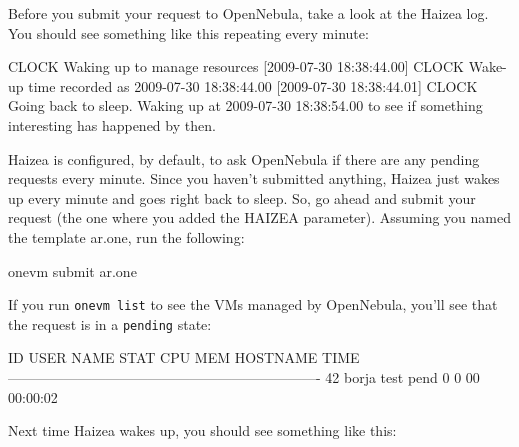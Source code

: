 Before you submit your request to OpenNebula, take a look at the Haizea log. You should see something like this repeating every minute:

\begin{wideshellverbatim}
[2009-07-30 18:38:44.00] CLOCK   Waking up to manage resources
[2009-07-30 18:38:44.00] CLOCK   Wake-up time recorded as 2009-07-30 18:38:44.00
[2009-07-30 18:38:44.01] CLOCK   Going back to sleep. 
                                 Waking up at 2009-07-30 18:38:54.00 
                                 to see if something interesting has happened by then.
\end{wideshellverbatim}

Haizea is configured, by default, to ask OpenNebula if there are any pending requests every minute. Since you haven't submitted anything, Haizea just wakes up every minute and goes right back to sleep. So, go ahead and submit your request (the one where you added the HAIZEA parameter). Assuming you named the template ar.one, run the following:

\begin{wideshellverbatim}
onevm submit ar.one
\end{wideshellverbatim}

If you run \texttt{onevm list} to see the VMs managed by OpenNebula, you'll see that the request is in a \texttt{pending} state:

\begin{wideshellverbatim}
  ID     USER     NAME STAT CPU     MEM        HOSTNAME        TIME
-------------------------------------------------------------------
  42    borja     test pend   0       0                 00 00:00:02
\end{wideshellverbatim}

Next time Haizea wakes up, you should see something like this:


